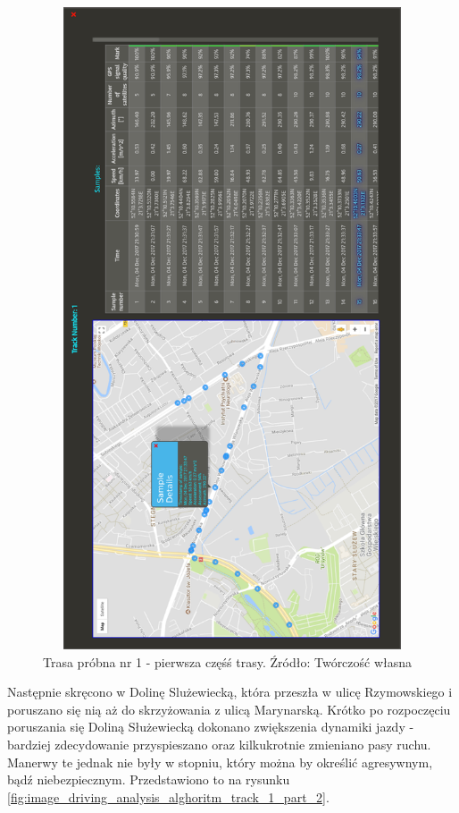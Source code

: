 \begin{figure}[H]
	\centering
	\includegraphics[height=19cm, width=13cm]{img/driving_analysis/test_track_1_lagodna.png}
	\caption{Trasa próbna nr 1 - pierwsza częśś trasy. Źródło: Twórczość własna}
	\label{fig:image_driving_analysis_alghoritm_track_1_part_1}
\end{figure}

Następnie skręcono w Dolinę Slużewiecką, która przeszła w ulicę Rzymowskiego i poruszano się nią aż do skrzyżowania z ulicą Marynarską. Krótko po rozpoczęciu poruszania się Doliną Służewiecką dokonano zwiększenia dynamiki jazdy - bardziej zdecydowanie przyspieszano oraz kilkukrotnie zmieniano pasy ruchu. Manerwy te jednak nie były w stopniu, który można by określić agresywnym, bądź niebezpiecznym. Przedstawiono to na rysunku \ref{fig:image_driving_analysis_alghoritm_track_1_part_2}.

